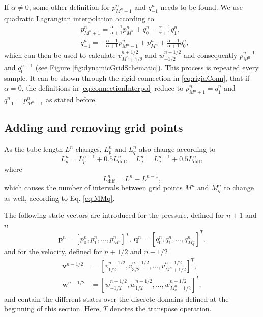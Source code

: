 %
If $\alpha \neq 0$, some other definition for $p_{{M^n}+1}^n$ and $q_{-1}^n$ needs to be found. We use quadratic Lagrangian interpolation according to
\begin{subequations}\label{eq:connectionInterpol}
\begin{align}
        &p_{M^n+1}^n = \frac{\alpha - 1}{\alpha + 1}p_{M^n}^n + q_0^n - \frac{\alpha - 1}{\alpha + 1}q_1^n,
    \label{eq:calcPMp1}\\
        &q_{-1}^n
        =-\frac{\alpha - 1}{\alpha + 1}p_{M^n-1}^n + p_{M^n}^n+ \frac{\alpha - 1}{\alpha + 1}q_{0}^n\label{eq:calcQm1},
\end{align}
\end{subequations}
which can then be used to calculate $v_{M^n+1/2}^{n+1/2}$ and $w_{-1/2}^{n+1/2}$ and consequently $p_{M^n}^{n+1}$ and $q_0^{n+1}$ (see Figure \ref{fig:dynamicGridSchematic}). This process is repeated every sample. It can be shown through the rigid connection in \eqref{eq:rigidConn}, that if $\alpha=0$, the definitions in \eqref{eq:connectionInterpol} reduce to $p_{M^n+1}^n = q_1^n$ and $q_{-1}^n = p_{M^n-1}^n$ as stated before.

\subsection{Adding and removing grid points}\label{sec:addRemove}
As the tube length $L^n$ changes, $L_p^n$ and $L_q^n$ also change according to
\begin{equation}
    L_p^n = L_p^{n-1} + 0.5 L_\text{diff}^n, \quad L_q^n =  L_q^{n-1} + 0.5L_\text{diff}^n,\label{eq:updateLs} 
\end{equation}
where
\begin{equation}
    L_\text{diff}^n = L^n-L^{n-1},\label{eq:lDiff}
\end{equation}
which causes the number of intervals between grid points $M^n$ and $M_q^n$ to change as well, according to Eq. \eqref{eq:MMq}.

The following state vectors are introduced for the pressure, defined for $n+1$ and $n$ %
\begin{equation}
    \mathbf{p}^n = [p_0^n, p_1^n, ..., p_{M^n}^n]^T,\ \mathbf{q}^n = [q_0^n, q_1^n, ..., q_{M_q^n}^n]^T,
\end{equation}
and for the velocity, defined for $n+1/2$ and $n-1/2$
\begin{equation}
    \begin{aligned}
        \mathbf{v}^{n-1/2} &=  [v_{1/2}^{n-1/2}, v_{3/2}^{n-1/2}, ..., v_{M^n+1/2}^{n-1/2}]^T,\\
        \mathbf{w}^{n-1/2} &=  [w_{-1/2}^{n-1/2}, w_{1/2}^{n-1/2}, ..., w_{M_q^n-1/2}^{n-1/2}]^T,
    \end{aligned}
\end{equation}
and contain the different states over the discrete domains defined at the beginning of this section. Here, $T$ denotes the transpose operation.

